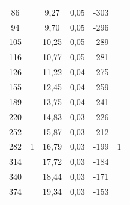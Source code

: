 \documentclass[a4paper,12pt]{report}
\begin{document}
\begin{table}[H]
\begin{tabular}{|c|c|c|c|c|c|}
86                            &                                       & 9,27                              & 0,05                              & -303                         &                                      \\ \cline{1-1} \cline{3-5}
94                            &                                       & 9,70                              & 0,05                              & -296                         &                                      \\ \cline{1-1} \cline{3-5}
105                           &                                       & 10,25                             & 0,05                              & -289                         &                                      \\ \cline{1-1} \cline{3-5}
116                           &                                       & 10,77                             & 0,05                              & -281                         &                                      \\ \cline{1-1} \cline{3-5}
126                           &                                       & 11,22                             & 0,04                              & -275                         &                                      \\ \cline{1-1} \cline{3-5}
155                           &                                       & 12,45                             & 0,04                              & -259                         &                                      \\ \hline
189 & \multirow{13}{*}{1} & 13,75 & 0,04 & -241 & \multirow{13}{*}{1} \\ \cline{1-1} \cline{3-5}
220 &                     & 14,83 & 0,03 & -226 &                     \\ \cline{1-1} \cline{3-5}
252 &                     & 15,87 & 0,03 & -212 &                     \\ \cline{1-1} \cline{3-5}
282 &                     & 16,79 & 0,03 & -199 &                     \\ \cline{1-1} \cline{3-5}
314 &                     & 17,72 & 0,03 & -184 &                     \\ \cline{1-1} \cline{3-5}
340 &                     & 18,44 & 0,03 & -171 &                     \\ \cline{1-1} \cline{3-5}
374 &                     & 19,34 & 0,03 & -153 &                     \\ \cline{1-1} \cline{3-5}

\end{tabular}
\end{table}
\end{document}
